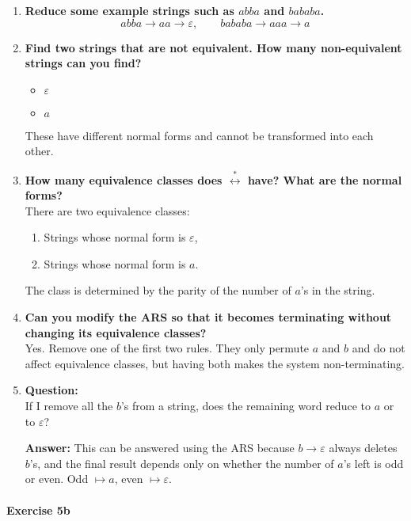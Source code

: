 \documentclass{article}
\theoremstyle{plain}
\theoremstyle{definition}
\theoremstyle{remark}
\begin{document}
\begin{enumerate}
  \item \textbf{Reduce some example strings such as $abba$ and $bababa$.}
  \[
    abba \to aa \to \varepsilon, \qquad
    bababa \to aaa \to a
  \]

  \item \textbf{Find two strings that are not equivalent. How many non-equivalent strings can you find?}
  \begin{itemize}
    \item $\varepsilon$
    \item $a$
  \end{itemize}
  These have different normal forms and cannot be transformed into each other.

  \item \textbf{How many equivalence classes does $\stackrel{\ast}{\longleftrightarrow}$ have? What are the normal forms?} \\
  There are two equivalence classes:
  \begin{enumerate}
    \item Strings whose normal form is $\varepsilon$,
    \item Strings whose normal form is $a$.
  \end{enumerate}
  The class is determined by the parity of the number of $a$’s in the string.

  \item \textbf{Can you modify the ARS so that it becomes terminating without changing its equivalence classes?} \\
  Yes. Remove one of the first two rules. They only permute $a$ and $b$ and do not affect equivalence classes, but having both makes the system non-terminating.

  \item \textbf{Question:} \\
  If I remove all the $b$’s from a string, does the remaining word reduce to $a$ or to $\varepsilon$?  

  \textbf{Answer:} This can be answered using the ARS because $b \to \varepsilon$ always deletes $b$’s, and the final result depends only on whether the number of $a$’s left is odd or even. Odd $\mapsto a$, even $\mapsto \varepsilon$.
\end{enumerate}

\paragraph{Exercise 5b}
\end{document}

